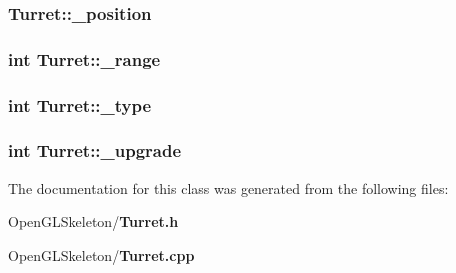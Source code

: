 \subsubsection[{\+\_\+position}]{ Turret\+::\+\_\+position}\label{class_turret_a0ef0ca5baa391a6874f97b6b3e440432}
\subsubsection[{\+\_\+range}]{\setlength{\rightskip}{0pt plus 5cm}int Turret\+::\+\_\+range}\label{class_turret_ae0343faa95df71e2a8bf7269e617fc72}
\subsubsection[{\+\_\+type}]{\setlength{\rightskip}{0pt plus 5cm}int Turret\+::\+\_\+type}\label{class_turret_a53bde4ee8aab3c1e2733445bfe26fb22}
\subsubsection[{\+\_\+upgrade}]{\setlength{\rightskip}{0pt plus 5cm}int Turret\+::\+\_\+upgrade}\label{class_turret_a9af84b28b71291fd780c2959d331532d}


The documentation for this class was generated from the following files\+:\begin{DoxyCompactItemize}
\item 
Open\+G\+L\+Skeleton/{\bf Turret.\+h}\item 
Open\+G\+L\+Skeleton/{\bf Turret.\+cpp}\end{DoxyCompactItemize}
